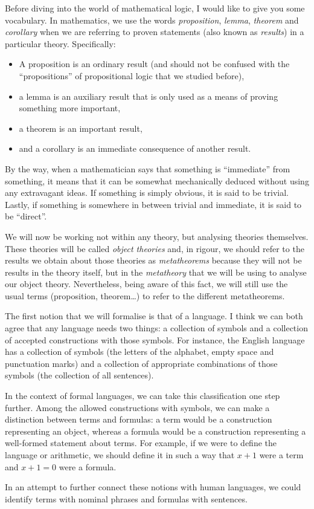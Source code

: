 \begin{para}
Before diving into the world of mathematical logic, I would like to give you some vocabulary. In mathematics, we use the words \emph{proposition}, \emph{lemma}, \emph{theorem} and \emph{corollary} when we are referring to proven statements (also known as \emph{results}) in a particular theory. Specifically:
\begin{itemize}
\item A proposition is an ordinary result (and should not be confused with the ``propositions'' of propositional logic that we studied before),
\item a lemma is an auxiliary result that is only used as a means of proving something more important,
\item a theorem is an important result,
\item and a corollary is an immediate consequence of another result.
\end{itemize}

By the way, when a mathematician says that something is ``immediate'' from something, it means that it can be somewhat mechanically deduced without using any extravagant ideas.
If something is simply obvious, it is said to be trivial.
Lastly, if something is somewhere in between trivial and immediate, it is said to be ``direct''.

We will now be working not within any theory, but analysing theories themselves. These theories will be called \emph{object theories} and, in rigour, we should refer to the results we obtain about those theories as \emph{metatheorems} because they will not be results in the theory itself, but in the \emph{metatheory} that we will be using to analyse our object theory. Nevertheless, being aware of this fact, we will still use the usual terms (proposition, theorem\ldots) to refer to the different metatheorems.
\end{para}

\begin{para}
The first notion that we will formalise is that of a language.
I think we can both agree that any language needs two things: a collection of symbols and a collection of accepted constructions with those symbols.
For instance, the English language has a collection of symbols (the letters of the alphabet, empty space and punctuation marks) and a collection of appropriate combinations of those symbols (the collection of all sentences).

In the context of formal languages, we can take this classification one step further.
Among the allowed constructions with symbols, we can make a distinction between terms and formulas: a term would be a construction representing an object, whereas a formula would be a construction representing a well-formed statement about terms.
For example, if we were to define the language or arithmetic, we should define it in such a way that $x+1$ were a term and $x+1 = 0$ were a formula.

In an attempt to further connect these notions with human languages, we could identify terms with nominal phrases and formulas with sentences.
\end{para}

